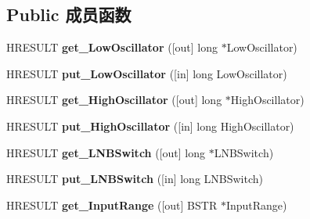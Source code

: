 \subsection*{Public 成员函数}
\begin{DoxyCompactItemize}
\item 
\mbox{\label{interface_i_d_v_b_s_tuning_space_a9f34c2de03c5c225b149daa7d8dade7d}} 
H\+R\+E\+S\+U\+LT {\bfseries get\+\_\+\+Low\+Oscillator} (\mbox{[}out\mbox{]} long $\ast$Low\+Oscillator)
\item 
\mbox{\label{interface_i_d_v_b_s_tuning_space_aab098ffc42edf6e9ff4430407a852286}} 
H\+R\+E\+S\+U\+LT {\bfseries put\+\_\+\+Low\+Oscillator} (\mbox{[}in\mbox{]} long Low\+Oscillator)
\item 
\mbox{\label{interface_i_d_v_b_s_tuning_space_a60f69a27f75daa9cc9da2c50e2237ce5}} 
H\+R\+E\+S\+U\+LT {\bfseries get\+\_\+\+High\+Oscillator} (\mbox{[}out\mbox{]} long $\ast$High\+Oscillator)
\item 
\mbox{\label{interface_i_d_v_b_s_tuning_space_ad2af3f043e05f7bcf1d2d06b9c9b9067}} 
H\+R\+E\+S\+U\+LT {\bfseries put\+\_\+\+High\+Oscillator} (\mbox{[}in\mbox{]} long High\+Oscillator)
\item 
\mbox{\label{interface_i_d_v_b_s_tuning_space_a2e3cfa250c13ab4996f9e74f02753126}} 
H\+R\+E\+S\+U\+LT {\bfseries get\+\_\+\+L\+N\+B\+Switch} (\mbox{[}out\mbox{]} long $\ast$L\+N\+B\+Switch)
\item 
\mbox{\label{interface_i_d_v_b_s_tuning_space_adabb5f2a7c789effaf2c123fb70b5d6e}} 
H\+R\+E\+S\+U\+LT {\bfseries put\+\_\+\+L\+N\+B\+Switch} (\mbox{[}in\mbox{]} long L\+N\+B\+Switch)
\item 
\mbox{\label{interface_i_d_v_b_s_tuning_space_a01b2a5ee38f015c37d4af43af877680e}} 
H\+R\+E\+S\+U\+LT {\bfseries get\+\_\+\+Input\+Range} (\mbox{[}out\mbox{]} B\+S\+TR $\ast$Input\+Range)
\item 
\mbox{\label{interface_i_d_v_b_s_tuning_space_a245bd51ca7446fd126558fc650e884de}} 

\end{DoxyCompactItemize}
